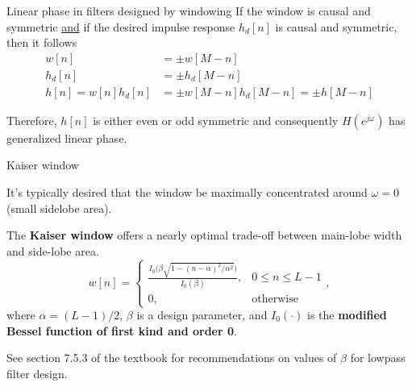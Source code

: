 \documentclass[10pt, aspectratio=169]{beamer}
\begin{document}
%
\begin{frame}{Linear phase in filters designed by windowing}
	If the window is causal and symmetric \underline{and} if the desired impulse response $h_d[n]$ is causal and symmetric, then it follows
	\begin{align}
		w[n] &= \pm w[M-n] \tag{causal and symmetric window} \\
		h_d[n] &= \pm h_d[M-n] \tag{causal and symmetric $h_d[n]$} \\
		h[n] = w[n]h_d[n] &= \pm w[M-n]h_d[M-n] = \pm h[M-n] \tag{causal and symmetric $h[n]$}
	\end{align}
	
	Therefore, $h[n]$ is either even or odd symmetric and consequently $H(e^{j\omega})$ has generalized linear phase.
	
\end{frame}

%
\begin{frame}{Kaiser window}

It's typically desired that the window be maximally concentrated around $\omega = 0$ (small sidelobe area).

The \textbf{Kaiser window} offers a nearly optimal trade-off between main-lobe width and side-lobe area.
\begin{equation*}
w[n] = \begin{cases}
\displaystyle\frac{I_0\Big(\beta\sqrt{1- (n-\alpha)^2/\alpha^2}\Big)}{I_0(\beta)}, & 0 \leq n \leq L-1 \\
0, & \text{otherwise}
\end{cases},
\end{equation*}
where $\alpha = (L-1)/2$, $\beta$ is a design parameter, and $I_0(\cdot)$ is the \textbf{modified Bessel function of first kind and order 0}.

See section 7.5.3 of the textbook for recommendations on values of $\beta$ for lowpass filter design.

\end{frame}
\end{document}
